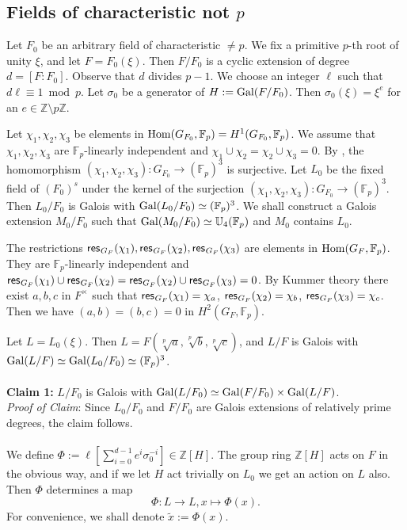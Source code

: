 \documentclass[12pt,leqno]{amsart}
\theoremstyle{plain}
\theoremstyle{definition}
\newcommand{\F}{{\mathbb F}}
\newcommand{\U}{{\mathbb U}}
\newcommand{\Z}{{\mathbb Z}}
\newcommand{\res}{{\text{\sf res}\hspace{.1ex} }}
\begin{document}
\subsection{Fields of characteristic not $p$}
Let $F_0$ be an arbitrary field of characteristic $\not=p$. We fix a primitive $p$-th root of unity $\xi$, and let $F=F_0(\xi)$. Then $F/F_0$ is a cyclic extension of degree $d=[F:F_0]$. Observe that $d$ divides $p-1$. We choose an integer $\ell$ such that $d\ell\equiv 1\bmod p$.
Let $\sigma_0$ be a generator of $H:={\rm Gal}(F/F_0)$. Then $\sigma_0(\xi)=\xi^e$ for an $e\in \Z\setminus p\Z$.

Let $\chi_1,\chi_2,\chi_3$ be elements in ${\rm Hom}(G_{F_0},\F_p)=H^1(G_{F_0},\F_p)$. We assume that   $\chi_1,\chi_2,\chi_3$ are $\F_p$-linearly independent and 
$\chi_1 \cup \chi_2 = \chi_2 \cup \chi_3 =0$.  By \cite[Lemma 2.6]{MT4}, the homomorphism  $(\chi_1,\chi_2,\chi_3)\colon G_{F_0}\to (\F_p)^3$ is surjective. 
  Let $L_0$ be the fixed field of $(F_0)^s$ under the kernel of the surjection $(\chi_1,\chi_2,\chi_3)\colon G_{F_0}\to (\F_p)^3$. Then $L_0/F_0$ is Galois with ${\rm Gal}(L_0/F_0)\simeq (\F_p)^3$. We shall construct a Galois extension $M_0/F_0$ such that ${\rm Gal}(M_0/F_0)\simeq \U_4(\F_p)$ and $M_0$ contains $L_0$.

The restrictions $\res_{G_F}(\chi_1),\res_{G_F}(\chi_2),\res_{G_F}(\chi_3)$ are elements in  ${\rm Hom}(G_F,\F_p)$. They are $\F_p$-linearly independent and 
$\res_{G_F}(\chi_1) \cup \res_{G_F}(\chi_2) =\res_{G_F}(\chi_2) \cup\res_{G_F}(\chi_3) =0$. 
By Kummer theory there exist $a,b,c$ in $F^\times$ such that $\res_{G_F}(\chi_1)=\chi_a$, $\res_{G_F}(\chi_2)=\chi_b$, $\res_{G_F}(\chi_3)=\chi_c$. Then we have
$(a,b)=(b,c)=0$ in $H^2(G_F,\F_p)$.


Let $L=L_0(\xi)$. Then $L=F(\sqrt[p]{a},\sqrt[p]{b},\sqrt[p]{c})$, and  $L/F$ is Galois with ${\rm Gal}(L/F)\simeq {\rm Gal}(L_0/F_0)\simeq (\F_p)^3$.
\\
\\
{\bf Claim 1:} $L/F_0$ is Galois with ${\rm Gal}(L/F_0)\simeq {\rm Gal}(F/F_0)\times {\rm Gal}(L/F)$.\\
{\it Proof of Claim}: Since $L_0/F_0$ and $F/F_0$ are Galois extensions of relatively prime degrees, the claim follows.
\\
\\
We define $\displaystyle \Phi:= \ell[\sum_{i=0}^{d-1}e^i\sigma_0^{-i}]\in \Z[H]$.  The group ring $\Z[H]$ acts on $F$ in the obvious way, and if we let $H$ act trivially on $L_0$ we get an action on $L$ also. Then $\Phi$ determines a map
\[
\Phi\colon L\to L, x\mapsto \Phi(x).
\]
For convenience, we shall denote $\tilde{x}:=\Phi(x)$.
\end{document}
